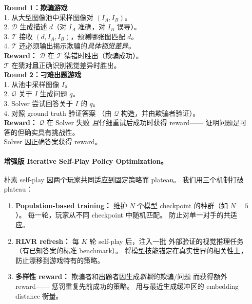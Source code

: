 \documentclass[12pt,a4paper]{article}
\begin{document}
\begin{tcolorbox}[colback=gray!5,colframe=gray!50,boxrule=0.3pt,left=4pt,right=4pt]
\small
\textbf{Round 1：欺骗游戏}\\
1. 从大型图像池中采样图像对 $(I_A, I_B)$。\\
2. $\mathcal{D}$ 生成描述 $d$（对 $I_A$ 准确，对 $I_B$ 误导）。\\
3. $\mathcal{T}$ 接收 $(d, I_A, I_B)$，预测哪张图匹配 $d$。\\
4. $\mathcal{T}$ 还必须输出揭示欺骗的\textit{具体视觉差异}。\\[4pt]
\textbf{Reward：}
$\mathcal{D}$ 在 $\mathcal{T}$ 猜错时胜出（欺骗成功）。\\
$\mathcal{T}$ 在猜对\textbf{且}正确识别视觉差异时胜出。\\[6pt]
\textbf{Round 2：刁难出题游戏}\\
1. 从池中采样图像 $I$。\\
2. $\mathcal{Q}$ 关于 $I$ 生成问题 $q$。\\
3. Solver 尝试回答关于 $I$ 的 $q$。\\
4. 对照 ground truth 验证答案
   （由 $\mathcal{Q}$ 构造，并由欺骗者验证）。\\[4pt]
\textbf{Reward：}
$\mathcal{Q}$ 在 Solver 失败
\textit{且}仔细重试后成功时获得 reward——
证明问题是可答的但确实具有挑战性。\\
Solver 因正确答案获得 reward。
\end{tcolorbox}

\paragraph{增强版 Iterative Self-Play Policy Optimization。}

朴素 self-play 因两个玩家共同适应到固定策略而 plateau。
我们用三个机制打破 plateau：

\begin{enumerate}[leftmargin=2em]
  \item \textbf{Population-based training：}
    维护 $N$ 个模型 checkpoint 的种群（如 $N = 5$）。
    每一轮，玩家从不同 checkpoint 中随机匹配。
    防止对单一对手的共适应。

  \item \textbf{RLVR refresh：}
    每 $K$ 轮 self-play 后，注入一批
    外部验证的视觉推理任务（有已知答案的标准 benchmark）。
    将模型技能锚定在真实世界的相关性上，
    防止漂移到游戏特有的策略。

  \item \textbf{多样性 reward：}
    欺骗者和出题者因生成\textit{新颖}的欺骗/问题
    而获得额外 reward——
    惩罚重复先前成功的策略。
    用与最近生成缓冲区的 embedding distance 衡量。
\end{enumerate}
\end{document}
